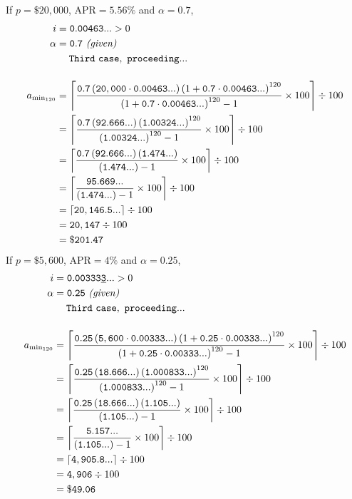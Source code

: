 \documentclass[12pt,letterpaper,oneside]{article}
\theoremstyle{remark} %
\begin{document}
	\newpage
	\renewcommand{\base}{\left(1+\mathtt{0.7}\cdot\mathtt{0.00463...}\right)}
	If $p=\$20,000$, $\mbox{APR}=5.56\%$ and $\alpha=0.7$,
	\begin{align*}
	i&=\mathtt{0.00463...}>0\\
	\alpha&=\mathtt{0.7}\ \textit{(given)}\\
	&\quad\;\mathtt{Third\ case,\ proceeding...}\\[12pt]
	a_{\rm{min_{120}}}&=\left\lceil{\frac{\mathtt{0.7}\left(\mathtt{20,000}\cdot\mathtt{0.00463...}\right)\base^{120}}{\base^{120}-1}\times 100}\right\rceil\div 100\\
	&=\left\lceil{\frac{\mathtt{0.7}\left(\mathtt{92.666...}\right)\left(\mathtt{1.00324...}\right)^{120}}{\left(\mathtt{1.00324...}\right)^{120}-1}\times 100}\right\rceil\div 100\\
	&=\left\lceil{\frac{\mathtt{0.7}\left(\mathtt{92.666...}\right)\left(\mathtt{1.474...}\right)}{\left(\mathtt{1.474...}\right)-1}\times 100}\right\rceil\div 100\\
	&=\left\lceil{\frac{\mathtt{95.669...}}{\left(\mathtt{1.474...}\right)-1}\times 100}\right\rceil\div 100\\
	&=\left\lceil{\mathtt{20,146.5...}}\right\rceil\div 100\\
	&=\mathtt{20,147}\div 100\\
	&=\mathtt{\$201.47}
	\end{align*}
	\renewcommand{\base}{\left(1+\mathtt{0.25}\cdot\mathtt{0.00333...}\right)}
	If $p=\$5,600$, $\mbox{APR}=4\%$ and $\alpha=0.25$,
	\begin{align*}
	i&=\mathtt{0.00333\underline{3}...}>0\\
	\alpha&=\mathtt{0.25}\ \textit{(given)}\\
	&\quad\;\mathtt{Third\ case,\ proceeding...}\\[12pt]
	a_{\rm{min_{120}}}&=\left\lceil{\frac{\mathtt{0.25}\left(\mathtt{5,600}\cdot\mathtt{0.00333...}\right)\base^{120}}{\base^{120}-1}\times 100}\right\rceil\div 100\\
	&=\left\lceil{\frac{\mathtt{0.25}\left(\mathtt{18.666...}\right)\left(\mathtt{1.000833...}\right)^{120}}{\left(\mathtt{1.000833...}\right)^{120}-1}\times 100}\right\rceil\div 100\\
	&=\left\lceil{\frac{\mathtt{0.25}\left(\mathtt{18.666...}\right)\left(\mathtt{1.105...}\right)}{\left(\mathtt{1.105...}\right)-1}\times 100}\right\rceil\div 100\\
	&=\left\lceil{\frac{\mathtt{5.157...}}{\left(\mathtt{1.105...}\right)-1}\times 100}\right\rceil\div 100\\
	&=\left\lceil{\mathtt{4,905.8...}}\right\rceil\div 100\\
	&=\mathtt{4,906}\div 100\\
	&=\mathtt{\$49.06}
	\end{align*}
\end{document}
